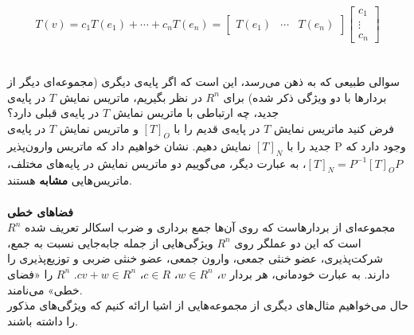 $$T(v) = c_{1}T(e_{1}) + \cdots + c_{n}T(e_{n}) = \begin{bmatrix}
T(e_{1}) & \cdots & T(e_{n})
\end{bmatrix}\begin{bmatrix}
c_{1}\\\vdots\\
c_{n}
\end{bmatrix}$$\\\\
سوالی طبیعی که به ذهن می‌رسد، این است که اگر پایه‌ی دیگری (مجموعه‌ای دیگر از بردار‌ها با دو ویژگی ذکر شده) برای $R^n$ در نظر بگیریم، ماتریس نمایش $T$ در پایه‌ی جدید، چه ارتباطی با ماتریس نمایش $T$ در پایه‌ی قبلی دارد؟\\
فرض کنید ماتریس نمایش $T$ در پایه‌ی قدیم را با $[T]_{O}$ و ماتریس نمایش $T$ در پایه‌ی جدید را با $[T]_{N}$ نمایش دهیم. نشان خواهیم داد که ماتریس وارون‌پذیر P وجود دارد که $[T]_{N} = P^{-1} [T]_{O}P$، به عبارت دیگر، می‌گوییم دو ماتریس نمایش در پایه‌های مختلف، ماتریس‌هایی \textbf{مشابه} هستند.\\\\
\textbf{فضا‌های خطی}\\
$R^n$ مجموعه‌ای از بردار‌هاست که روی آن‌ها جمع برداری و ضرب اسکالر تعریف شده است که این دو عملگر روی $R^n$ ویژگی‌هایی از جمله جا‌به‌جایی نسبت به جمع، شرکت‌پذیری، عضو خنثی جمعی، وارون جمعی، عضو خنثی ضربی و توزیع‌پذیری را دارند. به عبارت خودمانی، هر بردار $v$، $w\in R^n$، $c\in R$، $cv+w \in R^n$. $R^n$ را «فضا‌ی خطی» می‌نامند.\\
حال می‌خواهیم مثال‌های دیگری از مجموعه‌هایی از اشیا ارائه کنیم که ویژگی‌های مذکور را داشته باشند. 

